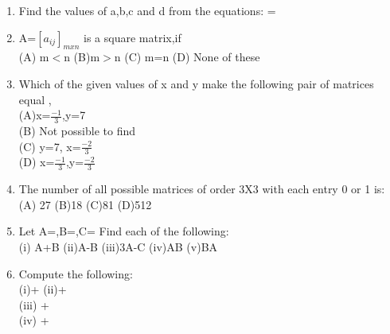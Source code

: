 \begin{enumerate}[label=\arabic*.,ref=\thesubsection.\theenumi]
\\
\solution 

\item Find the values of a,b,c and d from the equations:  = \\
\item A=$[a_{ij}]_{mxn}$ is a square matrix,if\\
(A) m$<$n (B)m$>$n (C) m=n (D) None of these\\
\item Which of the given values of x and y make the following pair of matrices equal ,\\
(A)x=$\frac{-1}{3}$,y=7 \\
 (B) Not possible to find\\
(C) y=7, x=$\frac{-2}{3}$\\
 (D) x=$\frac{-1}{3}$,y=$\frac{-2}{3}$\\
\item The number of all possible matrices of order 3X3 with each entry 0 or 1 is:\\
(A) 27 (B)18 (C)81 (D)512\\
\item Let A=,B=,C=
Find each of the following:\\
(i) A+B  (ii)A-B  (iii)3A-C  (iv)AB  (v)BA\\
\item Compute the following:\\
(i)+ (ii)+ \\
  (iii) +\\ 
(iv) +\\

\end{enumerate}
